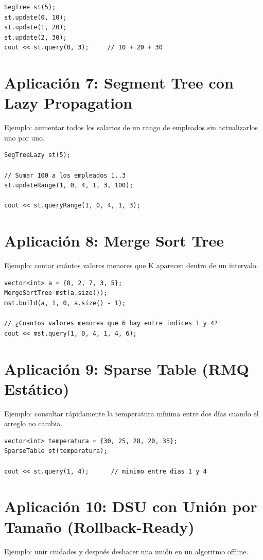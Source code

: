 \documentclass[10pt,twocolumn,letterpaper]{report}
\begin{document}
\begin{lstlisting}
SegTree st(5);
st.update(0, 10);
st.update(1, 20);
st.update(2, 30);
cout << st.query(0, 3);     // 10 + 20 + 30
\end{lstlisting}

\section{Aplicación 7: Segment Tree con Lazy Propagation}
Ejemplo: aumentar todos los salarios de un rango de empleados sin actualizarlos uno por uno.

\begin{lstlisting}
SegTreeLazy st(5);

// Sumar 100 a los empleados 1..3
st.updateRange(1, 0, 4, 1, 3, 100);

cout << st.queryRange(1, 0, 4, 1, 3);
\end{lstlisting}

\section{Aplicación 8: Merge Sort Tree}
Ejemplo: contar cuántos valores menores que K aparecen dentro de un intervalo.

\begin{lstlisting}
vector<int> a = {8, 2, 7, 3, 5};
MergeSortTree mst(a.size());
mst.build(a, 1, 0, a.size() - 1);

// ¿Cuantos valores menores que 6 hay entre indices 1 y 4?
cout << mst.query(1, 0, 4, 1, 4, 6);
\end{lstlisting}

\section{Aplicación 9: Sparse Table (RMQ Estático)}
Ejemplo: consultar rápidamente la temperatura mínima entre dos días cuando el arreglo no cambia.

\begin{lstlisting}
vector<int> temperatura = {30, 25, 28, 20, 35};
SparseTable st(temperatura);

cout << st.query(1, 4);      // minimo entre dias 1 y 4
\end{lstlisting}

\section{Aplicación 10: DSU con Unión por Tamaño (Rollback-Ready)}
Ejemplo: unir ciudades y después deshacer una unión en un algoritmo offline.
\end{document}
